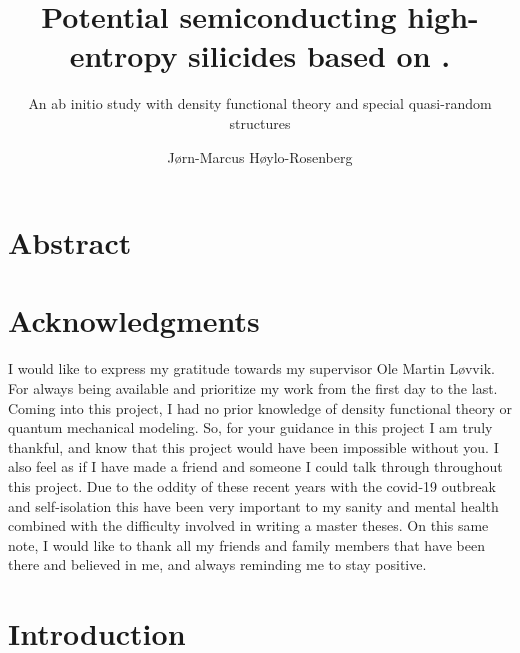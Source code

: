 \documentclass[UKenglish]{ifimaster}  %
\title{Potential semiconducting high-entropy silicides based on \ch{FeSi2}.}        %
\subtitle{An ab initio study with density functional theory and special quasi-random structures}         %
\author{Jørn-Marcus Høylo-Rosenberg}                      %
\begin{document}
\duoforside[dept={Department of Chemistry},   %
  program={Materials Science for Energy and Nanotechnology},  %
  long]                                        %

\frontmatter{}  

\chapter*{Abstract}                   %

\tableofcontents{}
\listoffigures{}
\listoftables{}

\chapter*{Acknowledgments}                    %

I would like to express my gratitude towards my supervisor Ole Martin Løvvik. For always being available and prioritize my work from the first day to the last. Coming into this project, I had no prior knowledge of density functional theory or quantum mechanical modeling. So, for your guidance in this project I am truly thankful, and know that this project would have been impossible without you. I also feel as if I have made a friend and someone I could talk through throughout this project. Due to the oddity of these recent years with the covid-19 outbreak and self-isolation this have been very important to my sanity and mental health combined with the difficulty involved in writing a master theses. On this same note, I would like to thank all my friends and family members that have been there and believed in me, and always reminding me to stay positive. 

\mainmatter{}

\chapter{Introduction}                  %
\end{document}
